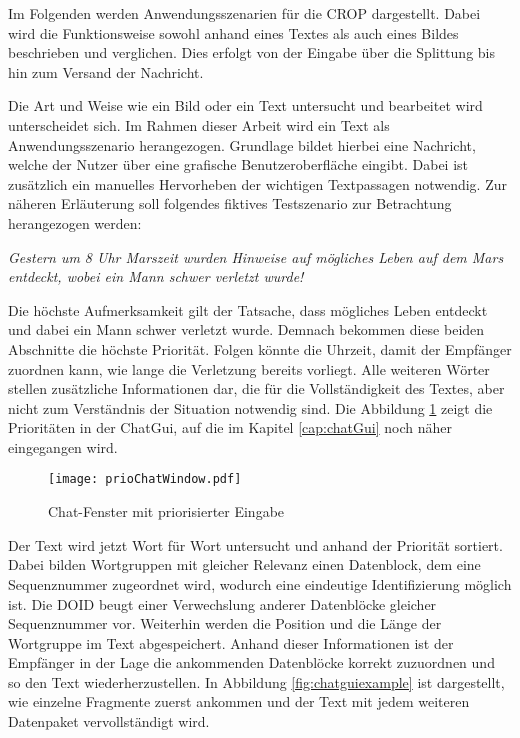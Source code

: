 \label{sec:Anwendungsszenarien}

Im Folgenden werden Anwendungsszenarien für die \gls{CROP} dargestellt. Dabei
wird die Funktionsweise sowohl anhand eines Textes als auch eines Bildes beschrieben und
verglichen. Dies erfolgt von der Eingabe über die Splittung bis hin zum Versand
der Nachricht.

Die Art und Weise wie ein Bild oder ein Text untersucht und bearbeitet wird
unterscheidet sich. Im Rahmen dieser Arbeit wird ein Text als
Anwendungsszenario herangezogen. Grundlage bildet hierbei eine Nachricht,
welche der Nutzer über eine grafische Benutzeroberfläche eingibt.
Dabei ist zusätzlich ein manuelles Hervorheben der wichtigen Textpassagen
notwendig. Zur näheren Erläuterung soll folgendes fiktives Testszenario zur
Betrachtung herangezogen werden:

\textit{\glqq Gestern um 8 Uhr Marszeit wurden Hinweise auf mögliches Leben auf
dem Mars entdeckt, wobei ein Mann schwer verletzt wurde! \grqq}

Die höchste Aufmerksamkeit gilt der Tatsache, dass mögliches Leben entdeckt und
dabei ein Mann schwer verletzt wurde. Demnach bekommen diese beiden Abschnitte
die höchste Priorität. Folgen könnte die Uhrzeit, damit der Empfänger zuordnen
kann, wie lange die Verletzung bereits vorliegt. Alle weiteren Wörter stellen
zusätzliche Informationen dar, die für die Vollständigkeit des Textes, aber
nicht zum Verständnis der Situation notwendig sind. Die Abbildung
\ref{fig:prioChatWindow} zeigt die Prioritäten in der ChatGui, auf die im
Kapitel \ref{cap:chatGui} noch näher eingegangen wird.

\begin{figure}[H]
	\centering
	\texttt{[image: prioChatWindow.pdf]}
	\label{fig:prioChatWindow}
	\caption{Chat-Fenster mit priorisierter Eingabe}
\end{figure}

Der Text wird jetzt Wort für Wort untersucht und anhand der Priorität sortiert.
Dabei bilden Wortgruppen mit gleicher Relevanz einen Datenblock, dem eine
Sequenznummer zugeordnet wird, wodurch eine eindeutige Identifizierung möglich
ist. Die \gls{DOID} beugt einer Verwechslung anderer Datenblöcke gleicher
Sequenznummer vor. Weiterhin werden die Position und die Länge der Wortgruppe im
Text abgespeichert. Anhand dieser Informationen ist der Empfänger in der Lage
die ankommenden Datenblöcke korrekt zuzuordnen und so den Text
wiederherzustellen.
In Abbildung \ref{fig:chatguiexample} ist dargestellt, wie einzelne Fragmente
zuerst ankommen und der Text mit jedem weiteren Datenpaket vervollständigt wird.

